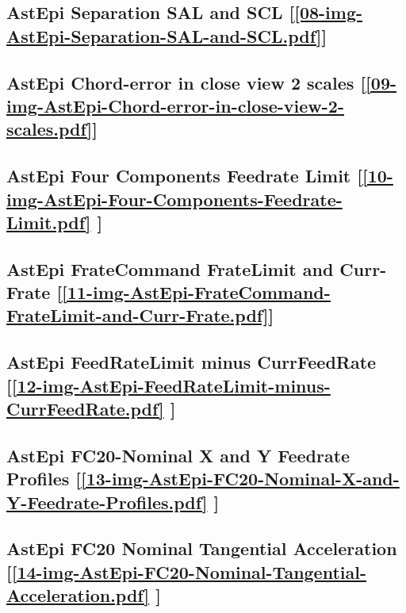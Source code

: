 \subsection       {AstEpi Separation SAL and SCL
	[\ref      {08-img-AstEpi-Separation-SAL-and-SCL.pdf}] }
\label{ssec-08-img-AstEpi-Separation-SAL-and-SCL.pdf}

\subsection       {AstEpi Chord-error in close view 2 scales
	[\ref      {09-img-AstEpi-Chord-error-in-close-view-2-scales.pdf}] }
\label{ssec-09-img-AstEpi-Chord-error-in-close-view-2-scales.pdf}

\subsection       {AstEpi Four Components Feedrate Limit
	[\ref      {10-img-AstEpi-Four-Components-Feedrate-Limit.pdf} ] }
\label{ssec-10-img-AstEpi-Four-Components-Feedrate-Limit.pdf}

\subsection    {AstEpi FrateCommand FrateLimit and Curr-Frate
	[\ref      {11-img-AstEpi-FrateCommand-FrateLimit-and-Curr-Frate.pdf}] }
\label{ssec-11-img-AstEpi-FrateCommand-FrateLimit-and-Curr-Frate.pdf}

\subsection     {AstEpi FeedRateLimit minus CurrFeedRate
	[\ref      {12-img-AstEpi-FeedRateLimit-minus-CurrFeedRate.pdf} ] }
\label{ssec-12-img-AstEpi-FeedRateLimit-minus-CurrFeedRate.pdf}

\subsection     {AstEpi FC20-Nominal X and Y Feedrate Profiles
	[\ref      {13-img-AstEpi-FC20-Nominal-X-and-Y-Feedrate-Profiles.pdf} ] }
\label{ssec-13-img-AstEpi-FC20-Nominal-X-and-Y-Feedrate-Profiles.pdf}

\subsection     {AstEpi FC20 Nominal Tangential Acceleration
	[\ref      {14-img-AstEpi-FC20-Nominal-Tangential-Acceleration.pdf} ] }
\label{ssec-14-img-AstEpi-FC20-Nominal-Tangential-Acceleration.pdf}

